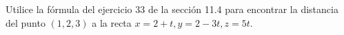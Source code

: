 \item Utilice la fórmula del ejercicio 33 de la sección 11.4 para encontrar la distancia del punto $(1, 2, 3)$ a la recta $x = 2 + t, y = 2 - 3t, z = 5t$.
